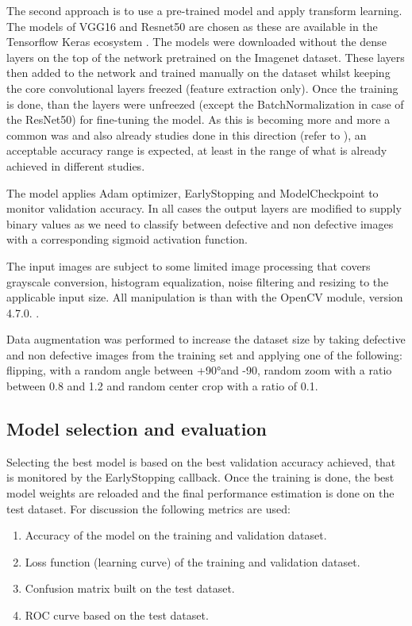 \documentclass[10pt, final]{article}
\begin{document}
The second approach is to use a pre-trained model and apply transform learning.
The models of VGG16 and Resnet50 are chosen as these are available in the Tensorflow
Keras ecosystem \cite{keras_applications}.
The models were downloaded without the dense layers on the top of the network pretrained on the Imagenet dataset.
These layers then added to the network and trained manually on the dataset whilst keeping the core convolutional
layers freezed (feature extraction only).
Once the training is done, than the layers were unfreezed (except the BatchNormalization in case of the ResNet50)
for fine-tuning the model.
As this is becoming more and more a common was and also already studies done in this direction
(refer to \cite{_railway_}), an acceptable accuracy range is expected, at least in the range of what is already
achieved in different studies.

The model applies Adam optimizer, EarlyStopping and ModelCheckpoint to monitor validation accuracy.
In all cases the output layers are modified to supply binary values as we need to classify between defective and
non defective images with a corresponding sigmoid activation function.

The input images are subject to some limited image processing that covers grayscale conversion, histogram equalization,
noise filtering and resizing to the applicable input size.
All manipulation is than with the OpenCV module, version 4.7.0. \cite{_home_}.

Data augmentation was performed to increase the dataset size by taking defective and non defective images
from the training set and applying one of the following: flipping, with a random angle between +90°and -90,
random zoom with a ratio between 0.8 and 1.2 and random center crop with a ratio of 0.1.

\subsection{Model selection and evaluation}
Selecting the best model is based on the best validation accuracy achieved, that is monitored by the EarlyStopping
callback.
Once the training is done, the best model weights are reloaded and the final performance estimation is done
on the test dataset.
For discussion the following metrics are used:
\begin{enumerate}
	\item Accuracy of the model on the training and validation dataset.
	\item Loss function (learning curve) of the training and validation dataset.
	\item Confusion matrix built on the test dataset.
	\item ROC curve based on the test dataset.
\end{enumerate}
\end{document}

